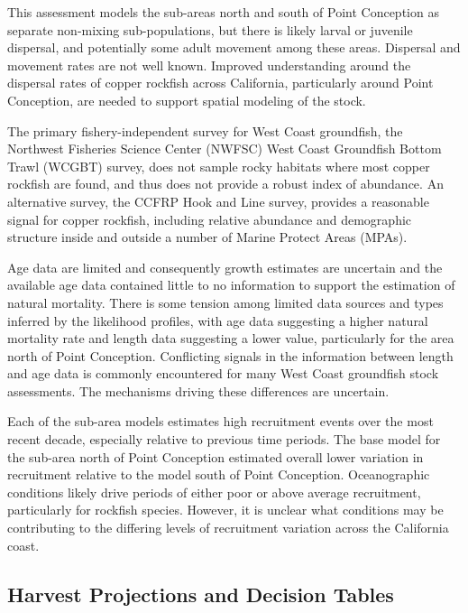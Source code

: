 \documentclass[11pt,
  letterpaper,
]{article}
\begin{document}
This assessment models the sub-areas north and south of Point Conception as separate non-mixing sub-populations, but there is likely larval or juvenile dispersal, and potentially some adult movement among these areas. Dispersal and movement rates are not well known. Improved understanding around the dispersal rates of copper rockfish across California, particularly around Point Conception, are needed to support spatial modeling of the stock.

The primary fishery-independent survey for West Coast groundfish, the Northwest Fisheries Science Center (NWFSC) West Coast Groundfish Bottom Trawl (WCGBT) survey, does not sample rocky habitats where most copper rockfish are found, and thus does not provide a robust index of abundance. An alternative survey, the CCFRP Hook and Line survey, provides a reasonable signal for copper rockfish, including relative abundance and demographic structure inside and outside a number of Marine Protect Areas (MPAs).

Age data are limited and consequently growth estimates are uncertain and the available age data contained little to no information to support the estimation of natural mortality. There is some tension among limited data sources and types inferred by the likelihood profiles, with age data suggesting a higher natural mortality rate and length data suggesting a lower value, particularly for the area north of Point Conception. Conflicting signals in the information between length and age data is commonly encountered for many West Coast groundfish stock assessments. The mechanisms driving these differences are uncertain.

Each of the sub-area models estimates high recruitment events over the most recent decade, especially relative to previous time periods. The base model for the sub-area north of Point Conception estimated overall lower variation in recruitment relative to the model south of Point Conception. Oceanographic conditions likely drive periods of either poor or above average recruitment, particularly for rockfish species. However, it is unclear what conditions may be contributing to the differing levels of recruitment variation across the California coast.

\subsection{Harvest Projections and Decision Tables}\label{harvest-projections-and-decision-tables}
\end{document}
